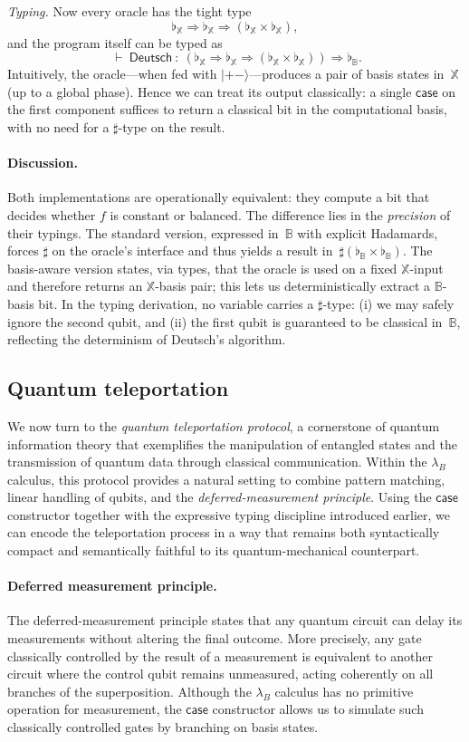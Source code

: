 \documentclass[runningheads,orivec,envcountsame,envcountsect]{llncs}
\newcommand\ket[1]{\ensuremath{|#1\rangle}}
\def\Arr{\Rightarrow}
\def\TYP#1#2#3{#1~{\vdash}~#2~{:}~#3}
\newcommand\B{\mathbb B}
\newcommand\XB{\mathbb X}
\newcommand{\lambdaB}{\lambda_B}
\newcommand\basis[1]{\ensuremath{\flat_{#1}}}
\begin{document}
\emph{Typing.}  
Now every oracle has the tight type
\[
  \basis{\XB}\Arr\basis{\XB}\Arr(\basis{\XB}\times\basis{\XB}),
\]
and the program itself can be typed as
\[
  \TYP{}{\mathsf{Deutsch}}
  {(\basis{\XB}\Arr\basis{\XB}\Arr(\basis{\XB}\times\basis{\XB}))\Arr\basis{\B}}.
\]
Intuitively, the oracle---when fed with $\ket{+-}$---produces a pair of
basis states in~$\XB$ (up to a global phase).  Hence we can treat its output
classically: a single $\mathsf{case}$ on the first component suffices to return
a classical bit in the computational basis, with no need for a $\sharp$-type on
the result.

\paragraph{Discussion.}
Both implementations are operationally equivalent: they compute a bit that
decides whether $f$ is constant or balanced.  The difference lies in the
\emph{precision} of their typings.  The standard version, expressed in~$\B$
with explicit Hadamards, forces $\sharp$ on the oracle's interface and thus
yields a result in~$\sharp(\basis{\B}\times\basis{\B})$.  The basis-aware
version states, via types, that the oracle is used on a fixed $\XB$-input and
therefore returns an $\XB$-basis pair; this lets us deterministically extract a
$\B$-basis bit.  In the typing derivation, no variable carries a $\sharp$-type:
(i) we may safely ignore the second qubit, and (ii) the first qubit is
guaranteed to be classical in~$\B$, reflecting the determinism of Deutsch's
algorithm.


\subsection{Quantum teleportation}\label{sec:teleportation}
We now turn to the \emph{quantum teleportation protocol}, a cornerstone of
quantum information theory that exemplifies the manipulation of entangled
states and the transmission of quantum data through classical communication.
Within the $\lambdaB$ calculus, this protocol provides a natural setting to
combine pattern matching, linear handling of qubits, and the
\emph{deferred-measurement principle}.  
Using the $\mathsf{case}$ constructor together with the expressive typing
discipline introduced earlier, we can encode the teleportation process in a
way that remains both syntactically compact and semantically faithful to its
quantum-mechanical counterpart.

\paragraph{Deferred measurement principle.}
The deferred-measurement principle states that any quantum circuit can delay
its measurements without altering the final outcome.  
More precisely, any gate classically controlled by the result of a measurement
is equivalent to another circuit where the control qubit remains unmeasured,
acting coherently on all branches of the superposition.  
Although the $\lambdaB$ calculus has no primitive operation for measurement,
the $\mathsf{case}$ constructor allows us to simulate such classically
controlled gates by branching on basis states.
\end{document}
